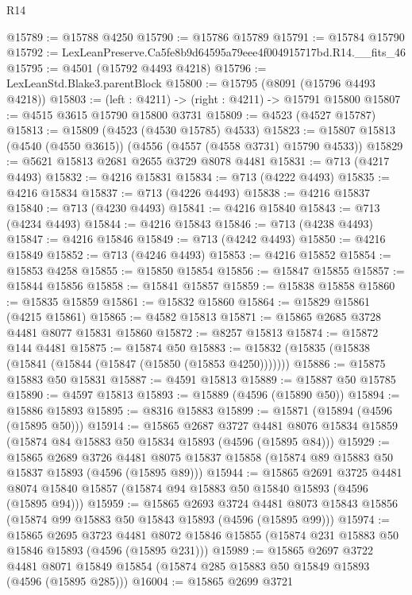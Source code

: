 \begin{lexlean}{R14}
\begin{coremodule}
@15789 := @15788 @4250
@15790 := @15786 @15789
@15791 := @15784 @15790
@15792 := LexLeanPreserve.Ca5fe8b9d64595a79eee4f004915717bd.R14.__fits_46
@15795 := @4501 (@15792 @4493 @4218)
@15796 := LexLeanStd.Blake3.parentBlock
@15800 := @15795 (@8091 (@15796 @4493 @4218))
@15803 := (left : @4211) -> (right : @4211) -> @15791 @15800
@15807 := @4515 @3615 @15790 @15800 @3731
@15809 := @4523 (@4527 @15787)
@15813 := @15809 (@4523 (@4530 @15785) @4533)
@15823 := @15807 @15813 (@4540 (@4550 @3615)) (@4556 (@4557 (@4558 @3731) @15790 @4533))
@15829 := @5621 @15813 @2681 @2655 @3729 @8078 @4481
@15831 := @713 (@4217 @4493)
@15832 := @4216 @15831
@15834 := @713 (@4222 @4493)
@15835 := @4216 @15834
@15837 := @713 (@4226 @4493)
@15838 := @4216 @15837
@15840 := @713 (@4230 @4493)
@15841 := @4216 @15840
@15843 := @713 (@4234 @4493)
@15844 := @4216 @15843
@15846 := @713 (@4238 @4493)
@15847 := @4216 @15846
@15849 := @713 (@4242 @4493)
@15850 := @4216 @15849
@15852 := @713 (@4246 @4493)
@15853 := @4216 @15852
@15854 := @15853 @4258
@15855 := @15850 @15854
@15856 := @15847 @15855
@15857 := @15844 @15856
@15858 := @15841 @15857
@15859 := @15838 @15858
@15860 := @15835 @15859
@15861 := @15832 @15860
@15864 := @15829 @15861 (@4215 @15861)
@15865 := @4582 @15813
@15871 := @15865 @2685 @3728 @4481 @8077 @15831 @15860
@15872 := @8257 @15813
@15874 := @15872 @144 @4481
@15875 := @15874 @50
@15883 := @15832 (@15835 (@15838 (@15841 (@15844 (@15847 (@15850 (@15853 @4250)))))))
@15886 := @15875 @15883 @50 @15831
@15887 := @4591 @15813
@15889 := @15887 @50 @15785
@15890 := @4597 @15813
@15893 := @15889 (@4596 (@15890 @50))
@15894 := @15886 @15893
@15895 := @8316 @15883
@15899 := @15871 (@15894 (@4596 (@15895 @50)))
@15914 := @15865
    @2687
    @3727
    @4481
    @8076
    @15834
    @15859
    (@15874 @84 @15883 @50 @15834 @15893 (@4596 (@15895 @84)))
@15929 := @15865
    @2689
    @3726
    @4481
    @8075
    @15837
    @15858
    (@15874 @89 @15883 @50 @15837 @15893 (@4596 (@15895 @89)))
@15944 := @15865
    @2691
    @3725
    @4481
    @8074
    @15840
    @15857
    (@15874 @94 @15883 @50 @15840 @15893 (@4596 (@15895 @94)))
@15959 := @15865
    @2693
    @3724
    @4481
    @8073
    @15843
    @15856
    (@15874 @99 @15883 @50 @15843 @15893 (@4596 (@15895 @99)))
@15974 := @15865
    @2695
    @3723
    @4481
    @8072
    @15846
    @15855
    (@15874 @231 @15883 @50 @15846 @15893 (@4596 (@15895 @231)))
@15989 := @15865
    @2697
    @3722
    @4481
    @8071
    @15849
    @15854
    (@15874 @285 @15883 @50 @15849 @15893 (@4596 (@15895 @285)))
@16004 := @15865
    @2699
    @3721

\end{coremodule}
\end{lexlean}
